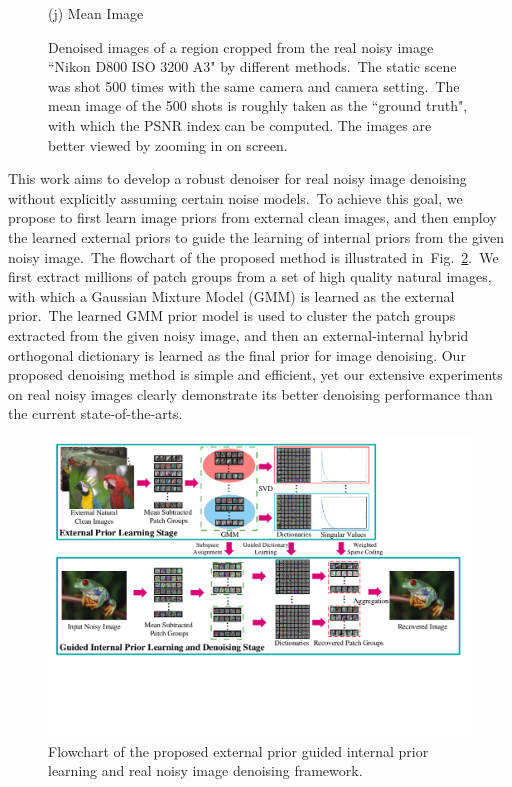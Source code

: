 \documentclass[10pt,twocolumn,letterpaper]{article}
\begin{document}
\begin{figure}
{\begin{minipage}[t]{0.195\textwidth}
{\footnotesize (j) Mean Image \cite{crosschannel2016} }
\end{minipage}
}\vspace{-1mm}
\caption{Denoised images of a region cropped from the real noisy image ``Nikon D800 ISO 3200 A3" \cite{crosschannel2016} by different methods.\ The static scene was shot 500 times with the same camera and camera setting.\ The mean image of the 500 shots is roughly taken as the ``ground truth", with which the PSNR index can be computed. The images are better viewed by zooming in on screen.} 
\label{fig1}
\end{figure}

This work aims to develop a robust denoiser for real noisy image denoising without explicitly assuming certain noise models.\ To achieve this goal, we propose to first learn image priors from external clean images, and then employ the learned external priors to guide the learning of internal priors from the given noisy image.\ The flowchart of the proposed method is illustrated in\ Fig.\ \ref{fig2}.\ We first extract millions of patch groups from a set of high quality natural images, with which a Gaussian Mixture Model (GMM) is learned as the external prior.\ The learned GMM prior model is used to cluster the patch groups extracted from the given noisy image, and then an external-internal hybrid orthogonal dictionary is learned as the final prior for image denoising. Our proposed denoising method is simple and efficient, yet our extensive experiments on real noisy images clearly demonstrate its better denoising performance than the current state-of-the-arts.

\begin{figure}\vspace{-2mm}
\centering
\includegraphics[width=0.95\linewidth]{Flowchart.pdf}
\vspace{-32mm}
\caption{Flowchart of the proposed external prior guided internal prior learning and real noisy image denoising framework.
}
\vspace{-1mm}
\label{fig2}
\end{figure}
\end{document}
